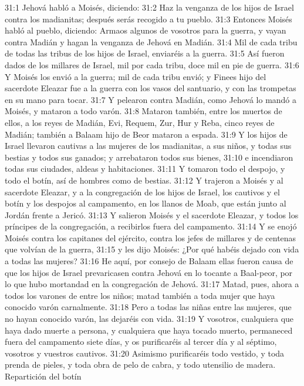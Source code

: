 31:1 Jehová habló a Moisés, diciendo:  
31:2 Haz la venganza de los hijos de Israel contra los madianitas; después serás recogido a tu pueblo.  
31:3 Entonces Moisés habló al pueblo, diciendo: Armaos algunos de vosotros para la guerra, y vayan contra Madián y hagan la venganza de Jehová en Madián.  
31:4 Mil de cada tribu de todas las tribus de los hijos de Israel, enviaréis a la guerra.  
31:5 Así fueron dados de los millares de Israel, mil por cada tribu, doce mil en pie de guerra.  
31:6 Y Moisés los envió a la guerra; mil de cada tribu envió; y Finees hijo del sacerdote Eleazar fue a la guerra con los vasos del santuario, y con las trompetas en su mano para tocar.  
31:7 Y pelearon contra Madián, como Jehová lo mandó a Moisés, y mataron a todo varón.  
31:8 Mataron también, entre los muertos de ellos, a los reyes de Madián, Evi, Requem, Zur, Hur y Reba, cinco reyes de Madián; también a Balaam hijo de Beor mataron a espada.  
31:9 Y los hijos de Israel llevaron cautivas a las mujeres de los madianitas, a sus niños, y todas sus bestias y todos sus ganados; y arrebataron todos sus bienes,  
31:10 e incendiaron todas sus ciudades, aldeas y habitaciones.  
31:11 Y tomaron todo el despojo, y todo el botín, así de hombres como de bestias.  
31:12 Y trajeron a Moisés y al sacerdote Eleazar, y a la congregación de los hijos de Israel, los cautivos y el botín y los despojos al campamento, en los llanos de Moab, que están junto al Jordán frente a Jericó.  
31:13 Y salieron Moisés y el sacerdote Eleazar, y todos los príncipes de la congregación, a recibirlos fuera del campamento.  
31:14 Y se enojó Moisés contra los capitanes del ejército, contra los jefes de millares y de centenas que volvían de la guerra,  
31:15 y les dijo Moisés: ¿Por qué habéis dejado con vida a todas las mujeres?  
31:16 He aquí, por consejo de Balaam ellas fueron causa de que los hijos de Israel prevaricasen contra Jehová en lo tocante a Baal-peor, por lo que hubo mortandad en la congregación de Jehová.  
31:17 Matad, pues, ahora a todos los varones de entre los niños; matad también a toda mujer que haya conocido varón carnalmente.  
31:18 Pero a todas las niñas entre las mujeres, que no hayan conocido varón, las dejaréis con vida.  
31:19 Y vosotros, cualquiera que haya dado muerte a persona, y cualquiera que haya tocado muerto, permaneced fuera del campamento siete días, y os purificaréis al tercer día y al séptimo, vosotros y vuestros cautivos.  
31:20 Asimismo purificaréis todo vestido, y toda prenda de pieles, y toda obra de pelo de cabra, y todo utensilio de madera.  
Repartición del botín  
